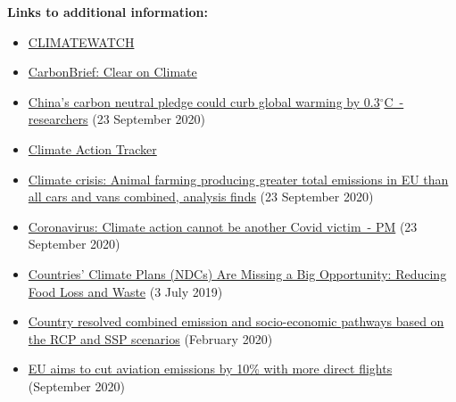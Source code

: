 \documentclass[12pt]{article}
\begin{document}
 \noindent \textbf{Links to additional information:}
 \begin{itemize}
 \item \href{https://www.climatewatchdata.org/}{CLIMATEWATCH} 
 \vspace{-.2cm} \item \href{https://www.carbonbrief.org/}{CarbonBrief: Clear on Climate} 
 \vspace{-.2cm} \item \href{https://uk.reuters.com/article/us-climate-change-china/chinas-carbon-neutral-pledge-could-curb-global-warming-by-0-3c-researchers-idUKKCN26E325?utm_campaign=Carbon%20Brief%20Daily%20Briefing&utm_medium=email&utm_source=Revue%20newsletter}{China's carbon neutral pledge could curb global warming by 0.3$^{\circ}$C~- researchers} (23 September 2020)
 \vspace{-.2cm} \item \href{https://climateactiontracker.org/}{Climate Action Tracker} 
 \vspace{-.2cm} \item \href{https://www.independent.co.uk/environment/farming-eu-emissions-cars-road-vehicles-climate-impact-greenpeace-b552317.html?utm_campaign=Carbon%20Brief%20Daily%20Briefing&utm_medium=email&utm_source=Revue%20newsletter}{Climate crisis: Animal farming producing greater total emissions in EU than all cars and vans combined, analysis finds} (23 September 2020)
 \vspace{-.2cm} \item \href{https://www.bbc.com/news/science-environment-54274644?utm_campaign=Carbon%20Brief%20Daily%20Briefing&utm_medium=email&utm_source=Revue%20newsletter}{Coronavirus: Climate action cannot be another Covid victim~- PM} (23 September 2020)
 \vspace{-.2cm} \item \href{https://www.wri.org/blog/2019/07/countries-climate-plans-ndcs-are-missing-big-opportunity-reducing-food-loss-and-waste}{Countries' Climate Plans (NDCs) Are Missing a Big Opportunity: Reducing Food Loss and Waste} (3 July 2019)
 \vspace{-.2cm} \item \href{https://zenodo.org/record/3638137#.X2sqPIuxU2w}{Country resolved combined emission and socio-economic pathways based on the RCP and SSP scenarios} (February 2020)
 \vspace{-.2cm} \item \href{https://uk.reuters.com/article/us-airlines-eu/eu-aims-to-cut-aviation-emissions-by-10-with-more-direct-flights-idUKKCN26D1KS?utm_campaign=Carbon%20Brief%20Daily%20Briefing&utm_medium=email&utm_source=Revue%20newsletter}{EU aims to cut aviation emissions by 10\% with more direct flights} (September 2020)

\end{itemize}
\end{document}
